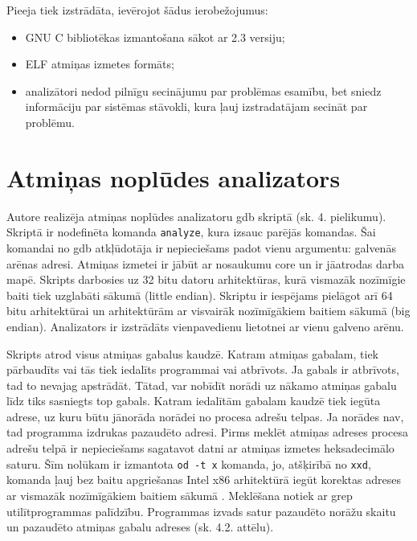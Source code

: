 Pieeja tiek izstrādāta, ievērojot šādus ierobežojumus: %
\begin{itemize}
	\item GNU C bibliotēkas izmantošana sākot ar 2.3 versiju;
    \item ELF atmiņas izmetes formāts;
    \item analizātori nedod pilnīgu secinājumu par problēmas esamību, bet sniedz informāciju par sistēmas stāvokli, kura ļauj izstradatājam secināt par problēmu.
\end{itemize}



\section{Atmiņas noplūdes analizators}
Autore realizēja atmiņas noplūdes analizatoru gdb skriptā (sk. 4. pielikumu). Skriptā ir nodefinēta komanda \texttt{analyze}, kura izsauc parējās komandas.
Šai komandai no gdb atkļūdotāja ir nepieciešams padot vienu argumentu: galvenās arēnas adresi.
Atmiņas izmetei ir jābūt ar nosaukumu core un ir jāatrodas darba mapē.
Skripts darbosies uz 32 bitu datoru arhitektūras, kurā vismazāk nozīmīgie baiti tiek uzglabāti sākumā (little endian).
Skriptu ir iespējams pielāgot arī 64 bitu arhitektūrai un arhitektūrām ar visvairāk nozīmīgākiem baitiem sākumā (big endian).
Analizators ir izstrādāts vienpavedienu lietotnei ar vienu galveno arēnu.

Skripts atrod visus atmiņas gabalus kaudzē. 
Katram atmiņas gabalam, tiek pārbaudīts vai tās tiek iedalīts programmai vai atbrīvots.
Ja gabals ir atbrīvots, tad to nevajag apstrādāt.
Tātad, var nobīdīt norādi uz nākamo atmiņas gabalu līdz tiks sasniegts top gabals.
Katram iedalītām gabalam kaudzē tiek iegūta adrese, uz kuru būtu jānorāda norādei no procesa adrešu telpas.
Ja norādes nav, tad programma izdrukas pazaudēto adresi.
Pirms meklēt atmiņas adreses procesa adrešu telpā ir nepieciešams sagatavot datni ar atmiņas izmetes heksadecimālo saturu.
Šīm nolūkam ir izmantota \texttt{od -t x} komanda, jo, atšķirībā no \texttt{xxd}, komanda ļauj bez baitu apgriešanas Intel x86 arhitektūrā iegūt korektas adreses ar  vismazāk nozīmīgākiem baitiem sākumā \cite{DPT}.
Meklēšana notiek ar grep utilītprogrammas palīdzību.
Programmas izvads satur pazaudēto norāžu skaitu un pazaudēto atmiņas gabalu adreses (sk. 4.2. attēlu).

